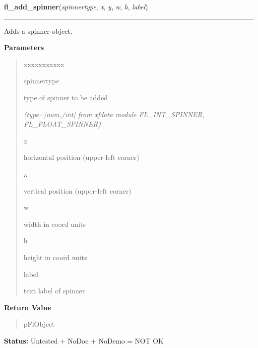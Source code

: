     \vspace{0.5ex}

\hspace{.8\funcindent}\begin{boxedminipage}{\funcwidth}

    \raggedright \textbf{fl\_add\_spinner}(\textit{spinnertype}, \textit{x}, \textit{y}, \textit{w}, \textit{h}, \textit{label})

    \vspace{-1.5ex}

    \rule{\textwidth}{0.5\fboxrule}
\setlength{\parskip}{2ex}
    Adds a spinner object.

\setlength{\parskip}{1ex}
      \textbf{Parameters}
      \vspace{-1ex}

      \begin{quote}
        \begin{Ventry}{xxxxxxxxxxx}

          \item[spinnertype]

          type of spinner to be added

            {\it (type=[num./int] from xfdata module FL\_INT\_SPINNER, FL\_FLOAT\_SPINNER)}

          \item[x]

          horizontal position (upper-left corner)

          \item[x]

          vertical position (upper-left corner)

          \item[w]

          width in coord units

          \item[h]

          height in coord units

          \item[label]

          text label of spinner

        \end{Ventry}

      \end{quote}

      \textbf{Return Value}
    \vspace{-1ex}

      \begin{quote}
      pFlObject

      \end{quote}

\textbf{Status:} Untested + NoDoc + NoDemo = NOT OK



    \end{boxedminipage}

